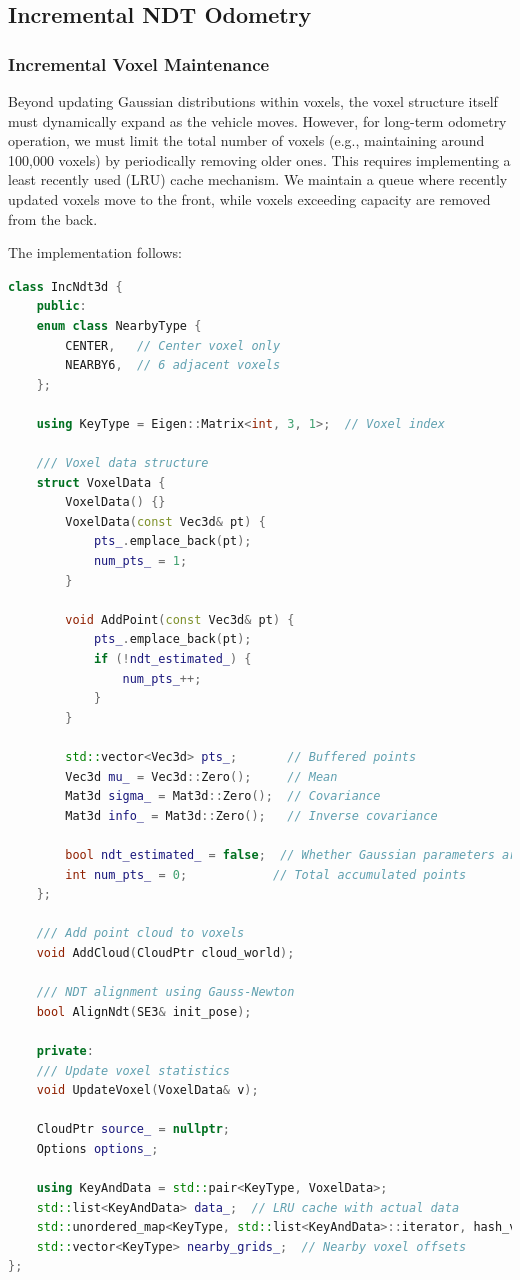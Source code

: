 \subsection{Incremental NDT Odometry}
\label{sec:inc-ndt}
\subsubsection{Incremental Voxel Maintenance}
Beyond updating Gaussian distributions within voxels, the voxel structure itself must dynamically expand as the vehicle moves. However, for long-term odometry operation, we must limit the total number of voxels (e.g., maintaining around 100,000 voxels) by periodically removing older ones. This requires implementing a least recently used (LRU) cache mechanism. We maintain a queue where recently updated voxels move to the front, while voxels exceeding capacity are removed from the back.

The implementation follows:

\begin{lstlisting}[language=c++,caption=src/ch7/ndt_inc.h]
class IncNdt3d {
	public:
	enum class NearbyType {
		CENTER,   // Center voxel only
		NEARBY6,  // 6 adjacent voxels
	};
	
	using KeyType = Eigen::Matrix<int, 3, 1>;  // Voxel index
	
	/// Voxel data structure
	struct VoxelData {
		VoxelData() {}
		VoxelData(const Vec3d& pt) {
			pts_.emplace_back(pt);
			num_pts_ = 1;
		}
		
		void AddPoint(const Vec3d& pt) {
			pts_.emplace_back(pt);
			if (!ndt_estimated_) {
				num_pts_++;
			}
		}
		
		std::vector<Vec3d> pts_;       // Buffered points
		Vec3d mu_ = Vec3d::Zero();     // Mean
		Mat3d sigma_ = Mat3d::Zero();  // Covariance
		Mat3d info_ = Mat3d::Zero();   // Inverse covariance
		
		bool ndt_estimated_ = false;  // Whether Gaussian parameters are estimated
		int num_pts_ = 0;            // Total accumulated points
	};
	
	/// Add point cloud to voxels
	void AddCloud(CloudPtr cloud_world);
	
	/// NDT alignment using Gauss-Newton
	bool AlignNdt(SE3& init_pose);
	
	private:
	/// Update voxel statistics
	void UpdateVoxel(VoxelData& v);
	
	CloudPtr source_ = nullptr;
	Options options_;
	
	using KeyAndData = std::pair<KeyType, VoxelData>;
	std::list<KeyAndData> data_;  // LRU cache with actual data
	std::unordered_map<KeyType, std::list<KeyAndData>::iterator, hash_vec<3>> grids_;  // Hashmap for fast lookup
	std::vector<KeyType> nearby_grids_;  // Nearby voxel offsets
};
\end{lstlisting}

